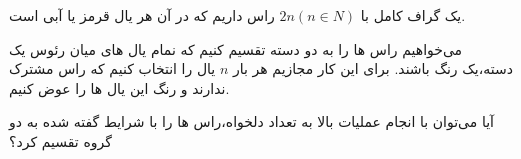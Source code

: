 \begin{PROBLEM}
	\p
	یک گراف کامل با 
	$2n (n\in N)$
	راس داریم که در آن هر یال قرمز یا آبی است.

	می‌خواهیم راس ها را به دو دسته تقسیم کنیم که نمام یال های میان رئوس یک دسته،‌یک رنگ باشند.
	برای این کار مجازیم هر بار 
	$n$
	یال را انتخاب کنیم که راس مشترک ندارند و رنگ این یال ها را عوض کنیم.

	آیا می‌توان با انجام عملیات بالا به تعداد دلخواه،‌راس ها را با شرایط گفته شده به دو گروه تقسیم کرد؟
	\SOLUTION{
		\p

	}
\end{PROBLEM}